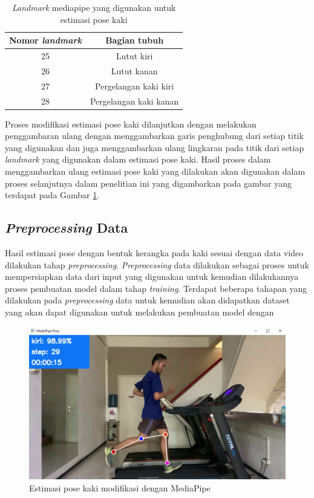 \begin{longtable}{|c|c|}
  \caption{\emph{Landmark} mediapipe yang digunakan untuk estimasi pose kaki}
  \label{tb:landmarkkaki}  \\
  \hline
  \rowcolor[HTML]{C0C0C0}
  \textbf{Nomor \emph{landmark}} & \textbf{Bagian tubuh} \\
  \hline
  25     & Lutut kiri     \\
  \hline
  26     & Lutut kanan     \\
  \hline
  27     & Pergelangan kaki kiri     \\
  \hline
  28     & Pergelangan kaki kanan    \\
  \hline
\end{longtable}

Proses modifikasi estimasi pose kaki dilanjutkan dengan melakukan penggambaran ulang dengan menggambarkan garis penghubung dari setiap titik yang digunakan dan juga menggambarkan ulang lingkaran pada titik dari setiap \emph{landmark} yang digunakan dalam estimasi pose kaki. Hasil proses dalam menggambarkan ulang estimasi pose kaki yang dilakukan akan digunakan dalam proses selanjutnya dalam penelitian ini yang digambarkan pada gambar yang terdapat pada Gambar \ref{fig:DeteksiEstimasi}.



\subsection{\emph{Preprocessing} Data}
\label{subsec:PreProcessingData}

Hasil estimasi pose dengan bentuk kerangka pada kaki sesuai dengan data video dilakukan tahap \emph{preprocessing}. \emph{Preprocessing} data dilakukan sebagai proses untuk mempersiapkan data dari input yang digunakan untuk kemudian dilakukannya proses pembuatan model dalam tahap \emph{training}. Terdapat beberapa tahapan yang dilakukan pada \emph{preprocessing} data untuk kemudian akan didapatkan dataset yang akan dapat digunakan untuk melakukan pembuatan model dengan 

\begin{figure}[H]
  \centering
  \includegraphics[scale=0.55]{gambar/deteksi pose.png}
  \caption{Estimasi pose kaki modifikasi dengan MediaPipe}
  \label{fig:DeteksiEstimasi}
\end{figure}

